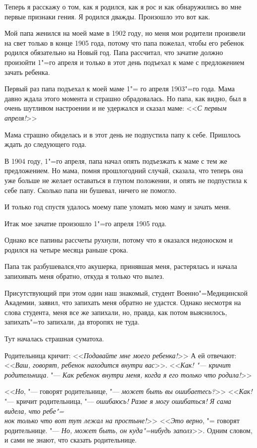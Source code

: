Теперь я расскажу о том, как я родился, 
как я рос и как обнаружились во мне первые
признаки гения. Я родился дважды. Произошло
это вот как.

Мой папа женился на моей маме в 1902 году, 
но меня мои родители произвели на свет
только в конце 1905 года, потому что папа
пожелал, чтобы его ребенок родился обязательно
на Новый год. Папа рассчитал, что зачатие
должно произойти 1"=го апреля и только в
этот день подъехал к маме с предложением зачать
ребенка.

Первый раз папа подъехал к моей маме 1"=
го апреля 1903"=го года. Мама давно ждала
этого момента и страшно обрадовалась. Но
папа, как видно, был в очень шутливом настроении
и не удержался и сказал маме: <<\textit{С
первым апреля!}>>

Мама страшно обиделась и в этот день не
подпустила папу к себе. Пришлось ждать до
следующего года.

В 1904 году, 1"=го апреля, папа начал
опять подъезжать к маме с тем же предложением.
Но мама, помня прошлогодний случай, сказала, 
что теперь она уже больше не желает
оставаться в глупом положении, и опять не
подпустила к себе папу. Сколько папа ни бушевал, 
ничего не помогло.

И только год спустя удалось моему папе
уломать мою маму и зачать меня.

Итак мое зачатие произошло 1"=го апреля
1905 года.

Однако все папины рассчеты рухнули, потому
что я оказался недоноском и родился на
четыре месяца раньше срока.

Папа так разбушевался,что акушерка, принявшая
меня, растерялась и начала запихивать
меня обратно, откуда я только что вылез.

Присутствующий при этом один наш знакомый,
студент Военно"=Медицинской Академии, заявил, 
что запихать меня обратно не удастся.
Однако несмотря на слова студента, меня все
же запихали, но, правда, как потом выяснилось,
запихать"=то запихали, да второпях не
туда.

Тут началась страшная суматоха.

Родительница кричит: <<\textit{Подавайте мне моего
ребенка!}>> А ей отвечают: <<\textit{Ваш, говорят,
ребенок находится внутри вас}>>. <<\textit{Как!  "---
кричит родительница.} "--- \textit{Как ребенок внутри
меня, когда я его только что родила!}>>

<<\textit{Но}, "--- говорят родительнице, "--- \textit{может
быть вы ошибаетесь?}>> <<\textit{Как!} "--- кричит родительница, 
"--- \textit{ошибаюсь! Разве я могу ошибаться! 
Я сама видела, что ребе"=\\
нок только что
вот тут лежал на простыне!}>> <<\textit{Это верно}, "=
говорят родительнице. "--- \textit{Но, может быть, он
куда"=нибудь заполз}>>. Одним словом, и сами
не знают, что сказать родительнице.


